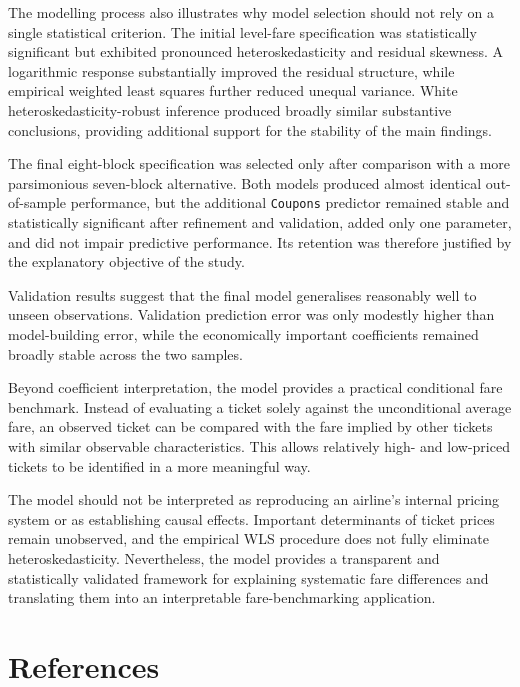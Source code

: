 \documentclass[11pt,a4paper]{article}
\begin{document}
The modelling process also illustrates why model selection should not rely on a single statistical criterion. The initial level-fare specification was statistically significant but exhibited pronounced heteroskedasticity and residual skewness. A logarithmic response substantially improved the residual structure, while empirical weighted least squares further reduced unequal variance. White heteroskedasticity-robust inference produced broadly similar substantive conclusions, providing additional support for the stability of the main findings.

The final eight-block specification was selected only after comparison with a more parsimonious seven-block alternative. Both models produced almost identical out-of-sample performance, but the additional \texttt{Coupons} predictor remained stable and statistically significant after refinement and validation, added only one parameter, and did not impair predictive performance. Its retention was therefore justified by the explanatory objective of the study.

Validation results suggest that the final model generalises reasonably well to unseen observations. Validation prediction error was only modestly higher than model-building error, while the economically important coefficients remained broadly stable across the two samples.

Beyond coefficient interpretation, the model provides a practical conditional fare benchmark. Instead of evaluating a ticket solely against the unconditional average fare, an observed ticket can be compared with the fare implied by other tickets with similar observable characteristics. This allows relatively high- and low-priced tickets to be identified in a more meaningful way.

The model should not be interpreted as reproducing an airline's internal pricing system or as establishing causal effects. Important determinants of ticket prices remain unobserved, and the empirical WLS procedure does not fully eliminate heteroskedasticity. Nevertheless, the model provides a transparent and statistically validated framework for explaining systematic fare differences and translating them into an interpretable fare-benchmarking application.


\clearpage

\section*{References}
\end{document}
